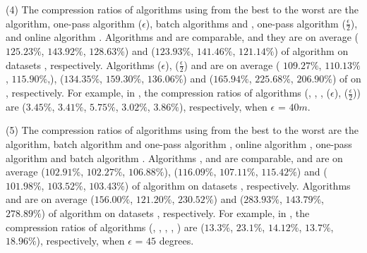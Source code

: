 \sstab(4) The compression ratios of algorithms using \sed from the best
to the worst are the \opt algorithm, one-pass algorithm \cised($\epsilon$), batch algorithms \tpa and
\dpa, one-pass algorithm \cised($\frac{\epsilon}{2}$), and online algorithm \squishe.
%
{Algorithms \tpa and \dpa are comparable, and they are on average
($125.23\%$, $143.92\%$, $128.63\%$) and ($123.93\%$, $141.46\%$, $121.14\%$)
 of algorithm \opt on datasets \dSets, respectively.}
%
{Algorithms \cised(${\epsilon}$), \cised($\frac{\epsilon}{2}$) and \squishe are on average (
  $109.27\%$, $110.13\%$, $115.90\%$,), ($134.35\%$, $159.30\%$, $136.06\%$) and ($165.94\%$, $225.68\%$, $206.90\%$)
 of \opt on \dSets, respectively.}
%
For example, in \mopsi, the compression ratios of algorithms
(\tpa, \dpa, \squishe, \cised(${\epsilon}$), \cised($\frac{\epsilon}{2}$))
are ($3.45\%$, $3.41\%$, $5.75\%$, $3.02\%$, $3.86\%$), respectively, when $\epsilon$ = $40m$.
%
%
%

\sstab(5) The compression ratios of algorithms using \dad from the best
to the worst are the \opt algorithm, batch algorithm \tpa and
one-pass algorithm \interval, online algorithm \opwa, one-pass algorithm \intersec and batch algorithm \dpa.
%
{Algorithms \tpa, \opwa and \interval are comparable, and are on average
($102.91\%$, $102.27\%$, $106.88\%$), ($116.09\%$, $107.11\%$, $115.42\%$) and ($101.98\%$, $103.52\%$, $103.43\%$)
 of algorithm \opt on datasets \dSets, respectively.}
%
{Algorithms \intersec and \dpa are on average ($156.00\%$, $121.20\%$, $230.52\%$) and ($283.93\%$, $143.79\%$, $278.89\%$)
 of algorithm \opt on datasets \dSets, respectively.}
%
For example, in \mopsi, the compression ratios of algorithms (\tpa, \dpa, \opwa, \interval, \intersec)
are ($13.3\%$, $23.1\%$, $14.12\%$, $13.7\%$, $18.96\%$), respectively, when $\epsilon$ = $45$ degrees.
%






